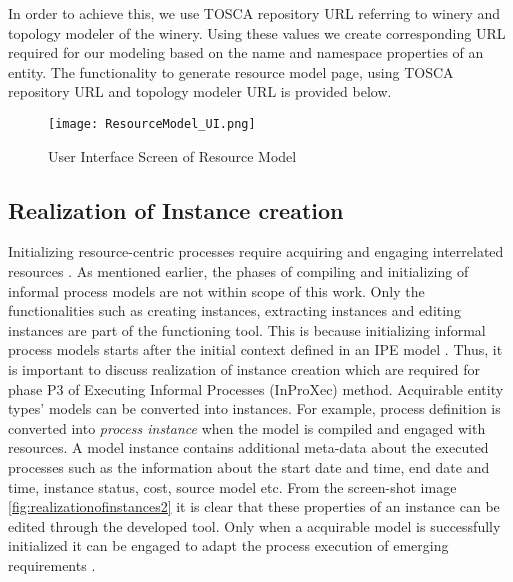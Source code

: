 In order to achieve this, we use TOSCA repository URL referring to winery and topology modeler of the winery. Using these values we create corresponding URL required for our modeling based on the name and namespace properties of an entity. The functionality to generate resource model page, using TOSCA repository URL and topology modeler URL is provided below.

			
			
\begin{figure}
	\centering
	\texttt{[image: ResourceModel\_UI.png]}
	\caption{User Interface Screen of Resource Model}
	\label{fig:realizationofresourcemodel}
\end{figure}
		
\subsection{Realization of Instance creation}
Initializing resource-centric processes require acquiring and engaging interrelated resources \cite{Sungur2015}. As mentioned earlier, the phases of compiling and initializing of informal process models are not within scope of this work. Only the functionalities such as creating instances, extracting instances and editing instances are part of the functioning tool. This is because initializing informal process models starts after the initial context defined in an IPE model \cite{Sungur2015}. Thus, it is important to discuss realization of instance creation which are required for phase P3 of Executing Informal Processes (InProXec) method. Acquirable entity types' models can be converted into instances. For example, process definition is converted into \textit{process instance} when the model is compiled and engaged with resources. A model instance contains additional meta-data about the executed processes such as the information about the start date and time, end date and time, instance status, cost, source model etc. From the screen-shot image \ref{fig:realizationofinstances2} it is clear that these properties of an instance can be edited through the developed tool. Only when a acquirable model is successfully initialized it can be engaged to adapt the process execution of emerging requirements \cite{Sungur2015}. 

